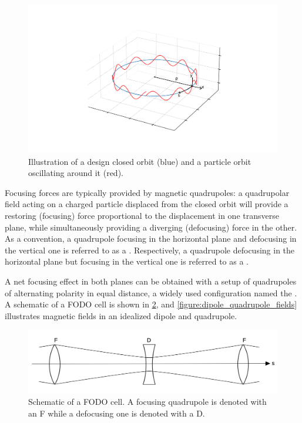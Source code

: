 \begin{figure}[!htb]
    \begin{center}
    \includegraphics[width = 0.9\linewidth]{Figures/Beam_Dynamics_Theory/design_vs_particle_orbit.pdf}
    \caption{Illustration of a design closed orbit (blue) and a particle orbit oscillating around it (red).}
    \label{figure:design_vs_particle_orbit}
    \end{center}
\end{figure}

Focusing forces are typically provided by magnetic quadrupoles: a quadrupolar field acting on a charged particle displaced from the closed orbit will provide a restoring (focusing) force proportional to the displacement in one transverse plane, while simultaneously providing a diverging (defocusing) force in the other. 
As a convention, a quadrupole focusing in the horizontal plane and defocusing in the vertical one is referred to as a . 
Respectively, a quadrupole defocusing in the horizontal plane but focusing in the vertical one is referred to as a .

A net focusing effect in both planes can be obtained with a setup of quadrupoles of alternating polarity in equal distance, a widely used configuration named the .
A schematic of a FODO cell is shown in \cref{figure:fodo_cell_schematic}, and \cref{figure:dipole_quadrupole_fields} illustrates magnetic fields in an idealized dipole and quadrupole.

\begin{figure}[!htb]
    \begin{center}
    \includegraphics[width = 0.8\linewidth]{Figures/Beam_Dynamics_Theory/fodo_cell_schematic.png}
    \caption{Schematic of a FODO cell. A focusing quadrupole is denoted with an F while a defocusing one is denoted with a D.}
    \label{figure:fodo_cell_schematic}
    \end{center}
\end{figure}

